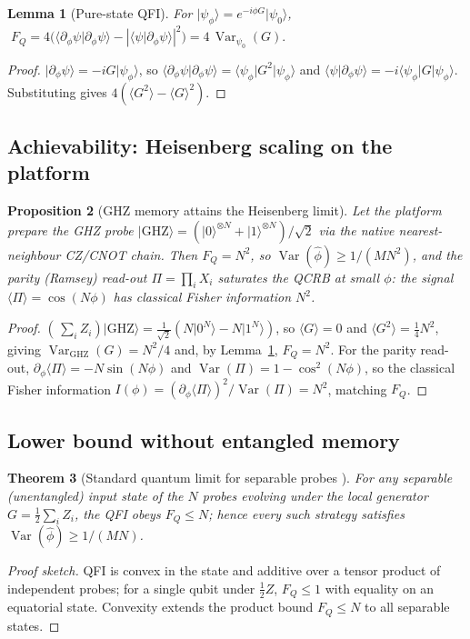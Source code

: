 \documentclass[11pt]{article}
\theoremstyle{plain}
\newtheorem{theorem}{Theorem}[section]
\newtheorem{proposition}[theorem]{Proposition}
\newtheorem{lemma}[theorem]{Lemma}
\theoremstyle{definition}
\theoremstyle{remark}
\newcommand{\Var}{\operatorname{Var}}
\newcommand{\ket}[1]{\lvert #1 \rangle}
\newcommand{\bra}[1]{\langle #1 \rvert}
\newcommand{\braket}[2]{\langle #1 \vert #2 \rangle}
\newcommand{\FQ}{F_{Q}}
\begin{document}
\begin{lemma}[Pure-state QFI]\label{lem:qfi}
For $\ket{\psi_\phi}=e^{-i\phi G}\ket{\psi_0}$, $\;\FQ=4\big(\bra{\partial_\phi\psi}\partial_\phi\psi\rangle-|\bra{\psi}\partial_\phi\psi\rangle|^2\big)=4\,\Var_{\psi_0}(G).$
\end{lemma}
\begin{proof}
$\ket{\partial_\phi\psi}=-iG\ket{\psi_\phi}$, so $\braket{\partial_\phi\psi}{\partial_\phi\psi}=\bra{\psi_\phi}G^2\ket{\psi_\phi}$ and $\bra\psi\partial_\phi\psi\rangle=-i\bra{\psi_\phi}G\ket{\psi_\phi}$. Substituting gives $4(\langle G^2\rangle-\langle G\rangle^2)$.\end{proof}

\subsection{Achievability: Heisenberg scaling on the platform}
\begin{proposition}[GHZ memory attains the Heisenberg limit]\label{prop:t2up}
Let the platform prepare the GHZ probe $\ket{\mathrm{GHZ}}=(\ket{0}^{\otimes N}+\ket{1}^{\otimes N})/\sqrt2$ via the native nearest-neighbour CZ/CNOT chain. Then $\FQ=N^2$, so $\Var(\widehat\phi)\ge 1/(MN^2)$, and the parity (Ramsey) read-out $\Pi=\prod_i X_i$ saturates the QCRB at small $\phi$: the signal $\langle\Pi\rangle=\cos(N\phi)$ has classical Fisher information $N^2$.
\end{proposition}
\begin{proof}
$(\,\sum_i Z_i)\ket{\mathrm{GHZ}}=\tfrac1{\sqrt2}(N\ket{0^N}-N\ket{1^N})$, so $\langle G\rangle=0$ and $\langle G^2\rangle=\tfrac14 N^2$, giving $\Var_{\mathrm{GHZ}}(G)=N^2/4$ and, by Lemma~\ref{lem:qfi}, $\FQ=N^2$. For the parity read-out, $\partial_\phi\langle\Pi\rangle=-N\sin(N\phi)$ and $\Var(\Pi)=1-\cos^2(N\phi)$, so the classical Fisher information $I(\phi)=(\partial_\phi\langle\Pi\rangle)^2/\Var(\Pi)=N^2$, matching $\FQ$.\end{proof}

\subsection{Lower bound without entangled memory}
\begin{theorem}[Standard quantum limit for separable probes \cite{GLM,Toth}]\label{thm:sql}
For any separable (unentangled) input state of the $N$ probes evolving under the local generator $G=\tfrac12\sum_i Z_i$, the QFI obeys $\FQ\le N$; hence every such strategy satisfies $\Var(\widehat\phi)\ge 1/(MN)$.
\end{theorem}
\begin{proof}[Proof sketch]
QFI is convex in the state and additive over a tensor product of independent probes; for a single qubit under $\tfrac12 Z$, $\FQ\le 1$ with equality on an equatorial state. Convexity extends the product bound $\FQ\le N$ to all separable states.\end{proof}
\end{document}
